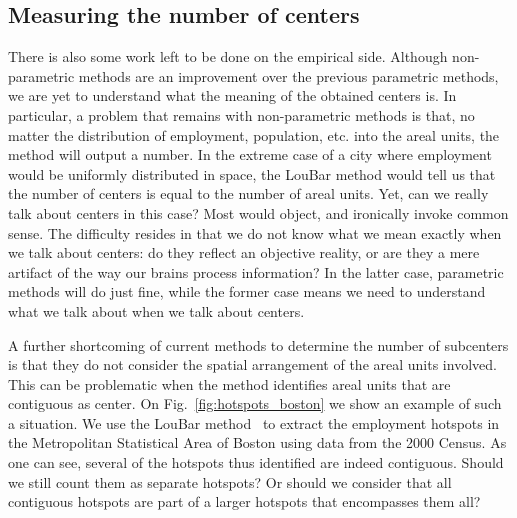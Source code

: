 \subsection{Measuring the number of centers}
\label{sub:measuring_the_number_of_centers}

There is also some work left to be done on the empirical side. Although
non-parametric methods are an improvement over the previous parametric methods,
we are yet to understand what the meaning of the obtained centers is. In
particular, a problem that remains with non-parametric methods is that, no
matter the distribution of employment, population, etc. into the areal units,
the method will output a number. In the extreme case of a city where employment
would be uniformly distributed in space, the LouBar method would tell us that
the number of centers is equal to the number of areal units. Yet, can we really
talk about centers in this case? Most would object, and ironically invoke common
sense. The difficulty resides in that we do not know what we mean exactly when
we talk about centers: do they reflect an objective reality, or are they a mere
artifact of the way our brains process information? In the latter case,
parametric methods will do just fine, while the former case means we need to
understand what we talk about when we talk about centers.  

A further shortcoming of current methods to determine the number of subcenters
is that they do not consider the spatial arrangement of the areal units
involved. This can be problematic when the method identifies areal units that
are contiguous as center. On Fig.~\ref{fig:hotspots_boston} we show an example
of such a situation. We use the LouBar method~\cite{Louail:2014} to extract the
employment hotspots in the Metropolitan Statistical Area of Boston using data
from the 2000 Census. As one can see, several of the hotspots thus identified
are indeed contiguous. Should we still count them as separate hotspots? Or
should we consider that all contiguous hotspots are part of a larger hotspots
that encompasses them all? 

